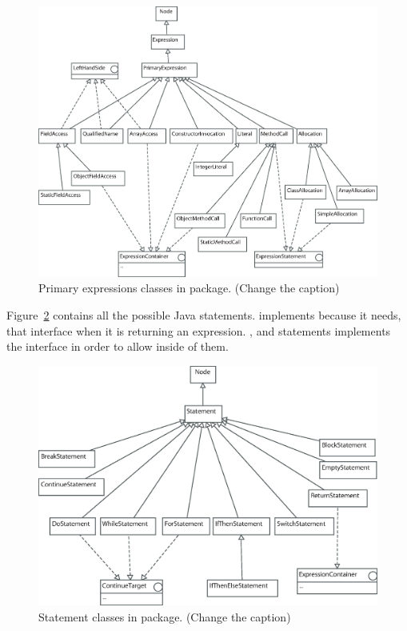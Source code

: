 \begin{figure}[!htb]
\begin{center}
\includegraphics[width=\textwidth]{images/primaryexpressions.eps}
\caption{Primary expressions classes in  package. (Change the caption)}
\label{fig:primary_expression_classes}
\end{center}
\end{figure}

Figure~\ref{fig:statement_classes} contains all the possible Java statements.  implements  because it needs, that interface when it is returning an expression. ,  and  statements implements the  interface in order to allow  inside of them.

\begin{figure}[!htb]
\begin{center}
\includegraphics[width=\textwidth]{images/statements.eps}
\caption{Statement classes in  package. (Change the caption)}
\label{fig:statement_classes}
\end{center}
\end{figure}

